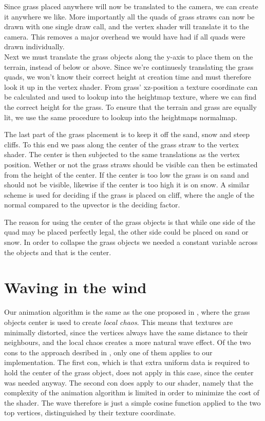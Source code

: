 
Since grass placed anywhere will now be translated to the camera, we
can create it anywhere we like. More importantly all the quads of
grass straws can now be drawn with one single draw call, and the
vertex shader will translate it to the camera. This removes a major
overhead we would have had if all quads were drawn individually. \\


Next we must translate the grass objects along the y-axis to place
them on the terrain, instead of below or above. Since we're
continuesly translating the grass quads, we won't know their correct
height at creation time and must therefore look it up in the vertex
shader. From grass' xz-position a texture coordinate can be calculated
and used to lookup into the heightmap texture, where we can find the
correct height for the grass. To ensure that the terrain and grass are
equally lit, we use the same procedure to lookup into the heightmaps
normalmap.


The last part of the grass placement is to keep it off the sand, snow
and steep cliffs. To this end we pass along the center of the grass
straw to the vertex shader. The center is then subjected to the same
translations as the vertex position. Wether or not the grass straws
should be visible can then be estimated from the height of the
center. If the center is too low the grass is on sand and should not
be visible, likewise if the center is too high it is on snow. A
similar scheme is used for deciding if the grass is placed on cliff,
where the angle of the normal compared to the upvector is the deciding
factor.

The reason for using the center of the grass objects is that while one
side of the quad may be placed perfectly legal, the other side could
be placed on sand or snow. In order to collapse the grass objects we
needed a constant variable across the objects and that is the center.


\section{Waving in the wind}

Our animation algorithm is the same as the one proposed in
, where the grass objects center is
used to create \emph{local chaos}. This means that textures are
minimally distorted, since the vertices always have the same distance
to their neighbours, and the local chaos creates a more natural wave
effect. Of the two cons to the approach desribed in
, only one of them applies to our
implementation. The first con, which is that extra uniform data is
required to hold the center of the grass object, does not apply in
this case, since the center was needed anyway. The second con does
apply to our shader, namely that the complexity of the animation
algorithm is limited in order to minimize the cost of the shader. The
wave therefore is just a simple cosine function applied to the two top
vertices, distinguished by their texture coordinate.


